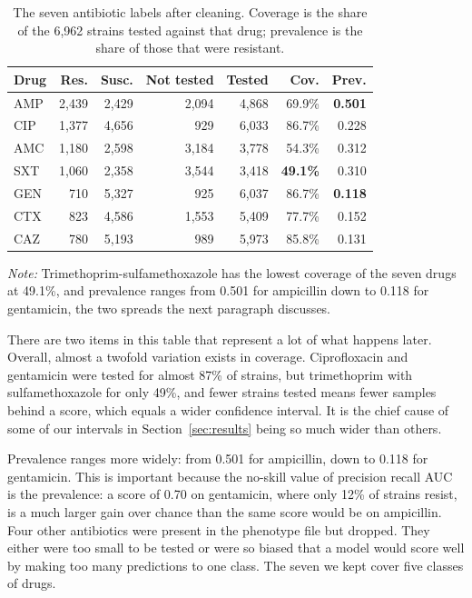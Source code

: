 \documentclass[journal]{IEEEtran}
\begin{document}
\begin{table}[!tb]
\caption{The seven antibiotic labels after cleaning. Coverage is the share of the
6,962 strains tested against that drug; prevalence is the share of those that were
resistant.}
\label{tab:labels}
\centering
\small
\setlength{\tabcolsep}{3pt}
\renewcommand{\arraystretch}{1.05}
\begin{tabular}{|l|r|r|r|r|r|r|}
\hline
\rowcolor{headgrey}
\textbf{Drug} & \textbf{Res.} & \textbf{Susc.} & \textbf{Not tested} & \textbf{Tested} & \textbf{Cov.} & \textbf{Prev.} \\ \hline
AMP & 2,439 & 2,429 & 2,094 & 4,868 & 69.9\% & \textbf{0.501} \\ \hline
CIP & 1,377 & 4,656 &   929 & 6,033 & 86.7\% & 0.228 \\ \hline
AMC & 1,180 & 2,598 & 3,184 & 3,778 & 54.3\% & 0.312 \\ \hline
SXT & 1,060 & 2,358 & 3,544 & 3,418 & \textbf{49.1\%} & 0.310 \\ \hline
GEN &   710 & 5,327 &   925 & 6,037 & 86.7\% & \textbf{0.118} \\ \hline
CTX &   823 & 4,586 & 1,553 & 5,409 & 77.7\% & 0.152 \\ \hline
CAZ &   780 & 5,193 &   989 & 5,973 & 85.8\% & 0.131 \\ \hline
\end{tabular}
\renewcommand{\arraystretch}{1.0}
\vspace{0.4em}

\noindent\footnotesize\textit{Note:} Trimethoprim-sulfamethoxazole has the lowest coverage of
the seven drugs at 49.1\%, and prevalence ranges from 0.501 for ampicillin down to 0.118 for
gentamicin, the two spreads the next paragraph discusses.
\end{table}

There are two items in this table that represent a lot of what happens later.
Overall, almost a twofold variation exists in coverage. Ciprofloxacin and
gentamicin were tested for almost 87\% of strains, but trimethoprim with
sulfamethoxazole for only 49\%, and fewer strains tested means fewer samples
behind a score, which equals a wider confidence interval. It is the chief cause of
some of our intervals in Section~\ref{sec:results} being so much wider than others.

Prevalence ranges more widely: from 0.501 for ampicillin, down to 0.118 for
gentamicin. This is important because the no-skill value of precision recall AUC is
the prevalence: a score of 0.70 on gentamicin, where only 12\% of strains
resist, is a much larger gain over chance than the same score would be on
ampicillin. Four other antibiotics were present in the phenotype file but dropped.
They either were too small to be tested or were so biased that a model would score
well by making too many predictions to one class. The seven we kept cover five
classes of drugs.
\end{document}
